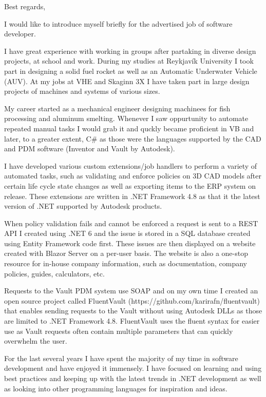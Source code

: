 \documentclass[11pt,a4paper,sans]{moderncv}
\begin{document}
{
    \fancyfoot[r]{}
    \setcounter{page}{0}
    \date{\today}
    \closing{Best regards,}
    
    \makelettertitle

    I would like to introduce myself briefly for the advertised job of software developer.

    I have great experience with working in groups after partaking in diverse design projects, at school and work. During my studies at Reykjavík University I took part in designing a solid fuel rocket as well as an Automatic Underwater Vehicle (AUV). At my jobs at VHE and Skaginn 3X I have taken part in large design projects of machines and systems of various sizes.

    My career started as a mechanical engineer designing machinees for fish processing and aluminum smelting. Whenever I saw oppurtunity to automate repeated manual tasks I would grab it and quckly became proficient in VB and later, to a greater extent, C\# as those were the languages supported by the CAD and PDM software (Inventor and Vault by Autodesk).
    
    I have developed various custom extensions/job handlers to perform a variety of automated tasks, such as validating and enforce policies on 3D CAD models after certain life cycle state changes as well as exporting items to the ERP system on release. These extensions are written in .NET Framework 4.8 as that it the latest version of .NET supported by Autodesk products.
    
    When policy validation fails and cannot be enforced a request is sent to a REST API I created using .NET 6 and the issue is stored in a SQL database created using Entity Framework code first. These issues are then displayed on a website created with Blazor Server on a per-user basis. The website is also a one-stop resource for in-house company information, such as documentation, company policies, guides, calculators, etc.

    Requests to the Vault PDM system use SOAP and on my own time I created an open source project called FluentVault (https://github.com/karirafn/fluentvault) that enables sending requests to the Vault without using Autodesk DLLs as those are limited to .NET Framework 4.8. FluentVault uses the fluent syntax for easier use as Vault requests often contain multiple parameters that can quickly overwhelm the user.

    For the last several years I have spent the majority of my time in software development and have enjoyed it immensely. I have focused on learning and using best practices and keeping up with the latest trends in .NET development as well as looking into other programming languages for inspiration and ideas.

}
\end{document}
